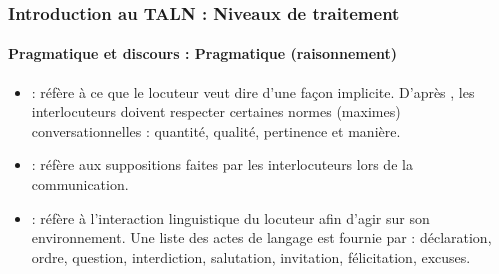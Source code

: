 \documentclass[xcolor=table]{beamer}
\begin{document}
\begin{frame}
\frametitle{Introduction au TALN : Niveaux de traitement}
\framesubtitle{Pragmatique et discours : Pragmatique (raisonnement)}


\begin{itemize}
	\item {} : réfère à ce que le locuteur veut dire d'une façon implicite.
	D'après \cite{1979-Grice}, les interlocuteurs doivent respecter certaines normes (maximes) conversationnelles  : quantité, qualité, pertinence et manière. 
	
	\item {} : réfère aux suppositions faites par les interlocuteurs lors de la communication.
	
	\item {} : réfère à l'interaction linguistique du locuteur afin d'agir sur son environnement. Une liste des actes de langage est fournie par \cite{1962-austin} : déclaration, ordre, question, interdiction, salutation, invitation, félicitation, excuses.
\end{itemize}

\end{frame}
\end{document}
